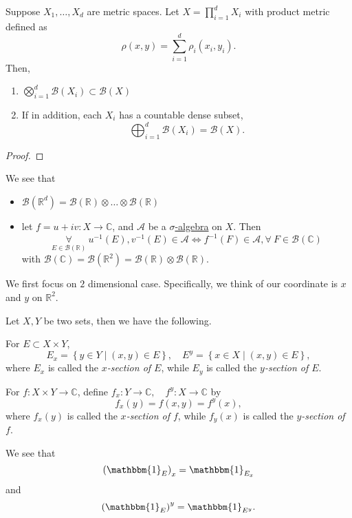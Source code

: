 \begin{theorem}
	Suppose \(X_1, \dots , X_d \) are metric spaces. Let \(X = \prod_{i=1}^{d} X_{i}\) with product metric defined as
	\[
		\rho (x, y) = \sum_{i=1}^{d} \rho _{i}(x_{i}, y_{i}).
	\]
	Then,
	\begin{enumerate}[(1)]
		\item \(\bigotimes_{i=1}^{d}\mathcal{B} (X_{i})\subset \mathcal{B} (X)\)
		\item If in addition, each \(X_{i}\) has a countable dense subset,
		      \[
			      \bigoplus_{i=1}^{d}\mathcal{B} (X_{i}) = \mathcal{B} (X).
		      \]
	\end{enumerate}
\end{theorem}
\begin{proof}
\end{proof}

\begin{remark}
	We see that
	\begin{itemize}
		\item \(\mathcal{B} (\mathbb{R} ^d) = \mathcal{B} (\mathbb{R} )\otimes \dots \otimes \mathcal{B} (\mathbb{R} ) \)
		\item let \(f = u + iv\colon X\to \mathbb{C} \), and \(\mathcal{A} \) be a \hyperref[def:sigma-algebra]{\(\sigma\)-algebra} on \(X\). Then
		      \[
			      \underset{E\in \mathcal{B} (\mathbb{R} )}{\forall }\ u^{-1} (E), v^{-1} (E)\in \mathcal{A}
			      \iff
			      f^{-1} (F)\in \mathcal{A}, \forall\ F\in \mathcal{B} (\mathbb{C} )
		      \]
		      with \(\mathcal{B} (\mathbb{C} ) = \mathcal{B} (\mathbb{R} ^2) = \mathcal{B} (\mathbb{R} )\otimes \mathcal{B} (\mathbb{R} )\).
	\end{itemize}
\end{remark}

We first focus on \(2\) dimensional case. Specifically, we think of our coordinate is \(x\) and \(y\) on \(\mathbb{R} ^2\).

\begin{definition*}
	Let \(X, Y\) be two sets, then we have the following.
	\begin{definition}
		For \(E\subset X\times Y\),
		\[
			E_x = \left\{y\in Y \mid (x, y)\in E\right\},\quad E^y = \left\{x\in X \mid (x, y)\in E\right\},
		\]
		where \(E_x\) is called the \emph{\(x\)-section of \(E\)}, while \(E_y\) is called the \emph{\(y\)-section of \(E\)}.
	\end{definition}
	\begin{definition}
		For \(f\colon X\times Y\to \mathbb{C} \), define \(f_x\colon Y\to \mathbb{C} ,\quad f^y\colon X\to \mathbb{C}\)
		by
		\[
			f_x(y) = f(x, y) = f^y(x),
		\]
		where \(f_x(y)\) is called the \emph{\(x\)-section of \(f\)}, while \(f_y(x)\) is called the \emph{\(y\)-section of \(f\)}.
	\end{definition}
\end{definition*}
\begin{eg}
	We see that
	\[
		\left(\mathbbm{1}_{E} \right)_x = \mathbbm{1}_{E_x}
	\]
	and
	\[
		\left(\mathbbm{1}_{E} \right)^y = \mathbbm{1}_{E^y}.
	\]
\end{eg}

